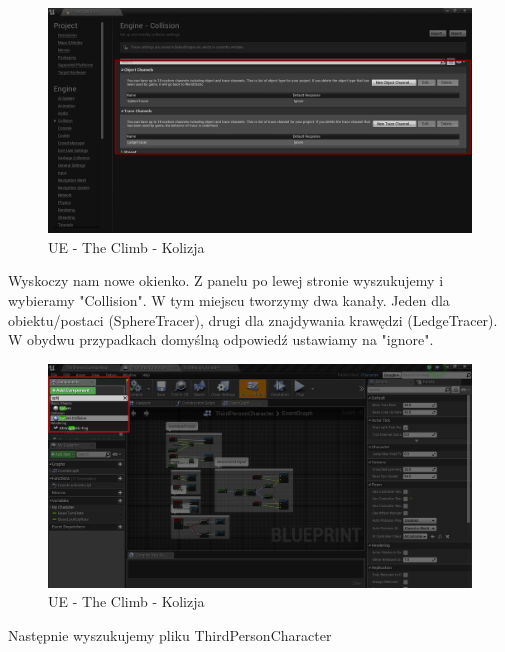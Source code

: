 \documentclass[brudnopis]{xmgr}
\begin{document}
\begin{figure}[!htb]
    \begin{center}
    \includegraphics[scale=0.35]{Screeny/UE-Climb-Collision.png}
    \end{center}
    \caption{UE - The Climb - Kolizja}
\end{figure}

Wyskoczy nam nowe okienko. Z panelu po lewej stronie wyszukujemy i wybieramy "Collision". W tym miejscu tworzymy dwa kanały. Jeden dla obiektu/postaci (SphereTracer), drugi dla znajdywania krawędzi (LedgeTracer). W obydwu przypadkach domyślną odpowiedź ustawiamy na "ignore".

\begin{figure}[!htb]
    \begin{center}
    \includegraphics[scale=0.35]{Screeny/UE-Climb-Sphere01.png}
    \end{center}
    \caption{UE - The Climb - Kolizja}
\end{figure}

Następnie wyszukujemy pliku ThirdPersonCharacter
\end{document}
